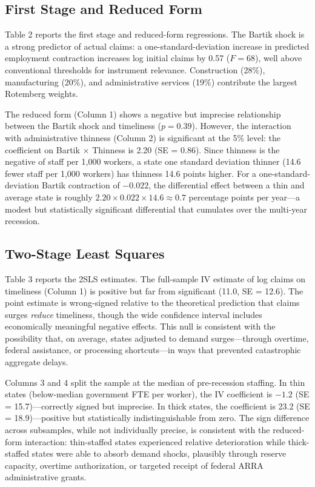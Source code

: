 \documentclass[12pt]{article}
\begin{document}
\subsection{First Stage and Reduced Form}



Table 2 reports the first stage and reduced-form regressions. The Bartik shock is a strong predictor of actual claims: a one-standard-deviation increase in predicted employment contraction increases log initial claims by 0.57 ($F = 68$), well above conventional thresholds for instrument relevance. Construction (28\%), manufacturing (20\%), and administrative services (19\%) contribute the largest Rotemberg weights.

The reduced form (Column 1) shows a negative but imprecise relationship between the Bartik shock and timeliness ($p = 0.39$). However, the interaction with administrative thinness (Column 2) is significant at the 5\% level: the coefficient on Bartik $\times$ Thinness is 2.20 (SE = 0.86). Since thinness is the negative of staff per 1,000 workers, a state one standard deviation thinner (14.6 fewer staff per 1,000 workers) has thinness 14.6 points higher. For a one-standard-deviation Bartik contraction of $-0.022$, the differential effect between a thin and average state is roughly $2.20 \times 0.022 \times 14.6 \approx 0.7$ percentage points per year---a modest but statistically significant differential that cumulates over the multi-year recession.

\subsection{Two-Stage Least Squares}



Table 3 reports the 2SLS estimates. The full-sample IV estimate of log claims on timeliness (Column 1) is positive but far from significant (11.0, SE = 12.6). The point estimate is wrong-signed relative to the theoretical prediction that claims surges \emph{reduce} timeliness, though the wide confidence interval includes economically meaningful negative effects. This null is consistent with the possibility that, on average, states adjusted to demand surges---through overtime, federal assistance, or processing shortcuts---in ways that prevented catastrophic aggregate delays.

Columns 3 and 4 split the sample at the median of pre-recession staffing. In thin states (below-median government FTE per worker), the IV coefficient is $-1.2$ (SE = 15.7)---correctly signed but imprecise. In thick states, the coefficient is 23.2 (SE = 18.9)---positive but statistically indistinguishable from zero. The sign difference across subsamples, while not individually precise, is consistent with the reduced-form interaction: thin-staffed states experienced relative deterioration while thick-staffed states were able to absorb demand shocks, plausibly through reserve capacity, overtime authorization, or targeted receipt of federal ARRA administrative grants.
\end{document}
